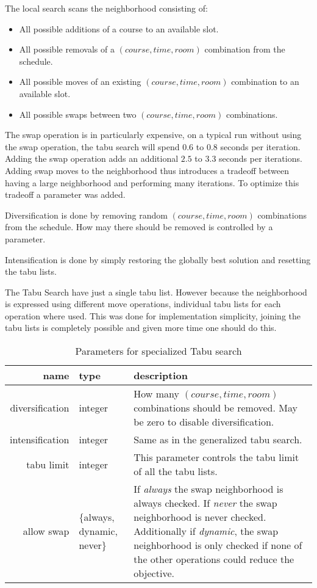 The local search scans the neighborhood consisting of:
\begin{itemize}
\item All possible additions of a course to an available slot.
\item All possible removals of a $(course, time, room)$ combination from the schedule.
\item All possible moves of an existing $(course, time, room)$ combination to an available slot.
\item All possible swaps between two $(course, time, room)$ combinations.
\end{itemize}

The swap operation is in particularly expensive, on a typical run without using the swap operation, the tabu search will spend $0.6$ to $0.8$ seconds per iteration. Adding the swap operation adds an additional $2.5$ to $3.3$ seconds per iterations. Adding swap moves to the neighborhood thus introduces a tradeoff between having a large neighborhood and performing many iterations. To optimize this tradeoff a parameter was added.

Diversification is done by removing random $(course, time, room)$ combinations from the schedule. How may there should be removed is controlled by a parameter.

Intensification is done by simply restoring the globally best solution and resetting the tabu lists.

The Tabu Search have just a single tabu list. However because the neighborhood is expressed using different move operations, individual tabu lists for each operation where used. This was done for implementation simplicity, joining the tabu lists is completely possible and given more time one should do this.

\begin{table}[H]
\centering
\begin{tabular}{r|p{2cm}|p{6cm}}
	name & type & description \\ \hline
	diversification & integer & How many $(course, time, room)$ combinations should be removed. May be zero to disable diversification. \\
	intensification & integer & Same as in the generalized tabu search. \\
	tabu limit & integer & This parameter controls the tabu limit of all the tabu lists. \\
	allow swap & $\{$always, dynamic, never$\}$ & If \textit{always} the swap neighborhood is always checked. If \textit{never} the swap neighborhood is never checked. Additionally if \textit{dynamic}, the swap neighborhood is only checked if none of the other operations could reduce the objective.
\end{tabular}
\caption{Parameters for specialized Tabu search}
\end{table}


